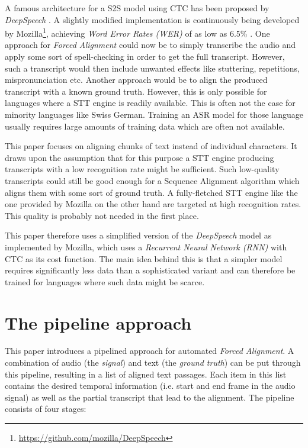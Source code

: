 \documentclass[letterpaper]{article}
\begin{document}
A famous architecture for a S2S model using CTC has been proposed by \textit{DeepSpeech} \parencite{deepspeech}. A slightly modified implementation is continuously being developed by Mozilla\footnote{\url{https://github.com/mozilla/DeepSpeech}}, achieving \textit{Word Error Rates (WER)} of as low as 6.5\% \parencite{mozillajourney}. One approach for \textit{Forced Alignment} could now be to simply transcribe the audio and apply some sort of spell-checking in order to get the full transcript. However, such a transcript would then include unwanted effects like stuttering, repetitions, mispronunciation etc. Another approach would be to align the produced transcript with a known ground truth. However, this is only possible for languages where a STT engine is readily available. This is often not the case for minority languages like Swiss German. Training an ASR model for those language usually requires large amounts of training data which are often not available.

This paper focuses on aligning chunks of text instead of individual characters. It draws upon the assumption that for this purpose a STT engine producing transcripts with a low recognition rate might be sufficient. Such low-quality transcripts could still be good enough for a Sequence Alignment algorithm which aligns them with some sort of ground truth. A fully-fletched STT engine like the one provided by Mozilla on the other hand are targeted at high recognition rates. This quality is probably not needed in the first place. 

This paper therefore uses a simplified version of the \textit{DeepSpeech} model as implemented by Mozilla, which uses a \textit{Recurrent Neural Network (RNN)} with CTC as its cost function. The main idea behind this is that a simpler model requires significantly less data than a sophisticated variant and can therefore be trained for languages where such data might be scarce.

\section{The pipeline approach}

This paper introduces a pipelined approach for automated \textit{Forced Alignment}. A combination of audio (the \textit{signal}) and text (the \textit{ground truth}) can be put through this pipeline, resulting in a list of aligned text passages. Each item in this list contains the desired temporal information (i.e. start and end frame in the audio signal) as well as the partial transcript that lead to the alignment. The pipeline consists of four stages:
\end{document}
